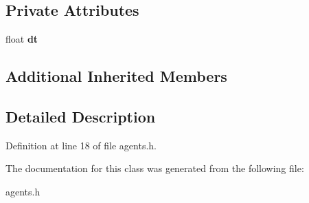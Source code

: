\subsection*{Private Attributes}
\begin{DoxyCompactItemize}
\item 
\mbox{\label{classagents_abbbc60318d34a17b9efccfe1c98e2a46}} 
float {\bfseries dt}
\end{DoxyCompactItemize}
\subsection*{Additional Inherited Members}


\subsection{Detailed Description}


Definition at line 18 of file agents.\+h.



The documentation for this class was generated from the following file\+:\begin{DoxyCompactItemize}
\item 
agents.\+h\end{DoxyCompactItemize}
